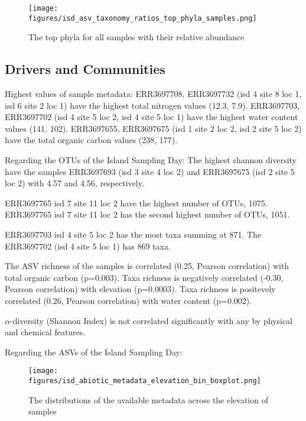 \begin{figure}[hbt!]
      \centering
      \texttt{[image: figures/isd\_asv\_taxonomy\_ratios\_top\_phyla\_samples.png]}
      \caption[Top phyla of each samples]{The top phyla for all samples with their relative abundance}
      \label{fig:isd_top_phyla_samples}
\end{figure}
   


\subsection{Drivers and Communities}\label{isd_communities}
Highest values of sample metadata:
ERR3697708, ERR3697732 (isd 4 site 8 loc 1, isd 6 site 2 loc 1) have the highest total nitrogen values (12.3, 7.9).
ERR3697703, ERR3697702 (isd 4 site 5 loc 2, isd 4 site 5 loc 1) have the highest water content values (141, 102).
ERR3697655, ERR3697675 (isd 1 site 2 loc 2, isd 2 site 5 loc 2) have the total organic carbon values (238, 177).


Regarding the OTUs of the Island Sampling Day:
The highest shannon diversity have the samples ERR3697693 (isd 3 site 4 loc 2) and
ERR3697675 (isd 2 site 5 loc 2) with 4.57 and 4.56, respectively.

ERR3697765 isd 7 site 11 loc 2 have the highest number of OTUs, 1075.
ERR3697765 isd 7 site 11 loc 2 has the second highest number of OTUs, 1051.

ERR3697703 isd 4 site 5 loc 2 has the most taxa summing at 871.
The ERR3697702 (isd 4 site 5 loc 1) has 869 taxa.

The ASV richness of the samples is correlated (0.25, Pearson correlation) with total organic carbon (p=0.003).
Taxa richness is negatively correlated (-0.30, Pearson correlation) with elevation (p=0.0003). 
Taxa richness is positevely correlated (0.26, Pearson correlation) with water content (p=0.002).

$\alpha$-diversity (Shannon Index) is not correlated significantly with any
by physical and chemical features.

Regarding the ASVs of the Island Sampling Day:



\begin{figure}[hbt!]
      \centering
      \texttt{[image: figures/isd\_abiotic\_metadata\_elevation\_bin\_boxplot.png]}
      \caption[Elevation and metadata distributions]{The distributions of the available metadata across the elevation of samples}
      \label{fig:isd_elevation_metadata}
\end{figure}


